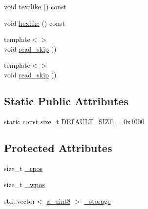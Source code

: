 \begin{DoxyCompactItemize}
\item 
void \hyperlink{class_agmd_network_1_1_byte_buffer_a7d8ab902ddcb4d13428ddb557da91e67}{textlike} () const 
\item 
void \hyperlink{class_agmd_network_1_1_byte_buffer_a1aa14bb23bfaf057445f1bede2a461d1}{hexlike} () const 
\item 
{\footnotesize template$<$$>$ }\\void \hyperlink{class_agmd_network_1_1_byte_buffer_af6e3d08537d2716cfba1c9dcd2d73450}{read\+\_\+skip} ()
\item 
{\footnotesize template$<$$>$ }\\void \hyperlink{class_agmd_network_1_1_byte_buffer_af6e3d08537d2716cfba1c9dcd2d73450}{read\+\_\+skip} ()
\end{DoxyCompactItemize}
\subsection*{Static Public Attributes}
\begin{DoxyCompactItemize}
\item 
static const size\+\_\+t \hyperlink{class_agmd_network_1_1_byte_buffer_a152263f475290fe24839a64ef4d2b0d4}{D\+E\+F\+A\+U\+L\+T\+\_\+\+S\+I\+Z\+E} = 0x1000
\end{DoxyCompactItemize}
\subsection*{Protected Attributes}
\begin{DoxyCompactItemize}
\item 
size\+\_\+t \hyperlink{class_agmd_network_1_1_byte_buffer_af3874e3f81641a76da487879b5d861a9}{\+\_\+rpos}
\item 
size\+\_\+t \hyperlink{class_agmd_network_1_1_byte_buffer_ad5b87e7a5fe12a9e0499c65082b21208}{\+\_\+wpos}
\item 
std\+::vector$<$ \hyperlink{_common_defines_8h_afbe6c09973474a1f78f870f39073398f}{a\+\_\+uint8} $>$ \hyperlink{class_agmd_network_1_1_byte_buffer_a72541e039bd7f1b0573b2a1af04e4d4c}{\+\_\+storage}
\end{DoxyCompactItemize}


